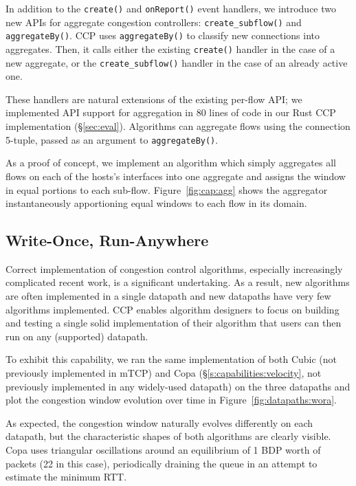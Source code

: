  In addition to the \texttt{create()} and \texttt{onReport()} event handlers, we introduce two new APIs for aggregate congestion controllers: \texttt{create\_subflow()} and \texttt{aggregateBy()}.
CCP uses \texttt{aggregateBy()} to classify new connections into aggregates. Then, it calls either the existing \texttt{create()} handler in the case of a new aggregate, or the \texttt{create\_subflow()} handler in the case of an already active one.

These handlers are natural extensions of the existing per-flow API; we implemented API support for aggregation in $80$ lines of code in our Rust CCP implementation (\S\ref{sec:eval}).
Algorithms can aggregate flows using the connection 5-tuple, passed as an argument to \texttt{aggregateBy()}.

As a proof of concept, we implement an algorithm which simply aggregates all flows on each of the hosts's interfaces into one aggregate and assigns the window in equal portions to each sub-flow.
Figure~\ref{fig:cap:agg} shows the aggregator instantaneously apportioning equal windows to each flow in its domain.

 
\subsection{Write-Once, Run-Anywhere}
\label{s:capabilities:wora}
\label{s:datapaths:eval}

Correct implementation of congestion control algorithms, especially increasingly complicated recent work, is a significant undertaking.
As a result, new algorithms are often implemented in a single datapath and new datapaths have very few algorithms implemented. 
CCP enables algorithm designers to focus on building and testing a single solid implementation of their algorithm that users can then run on any (supported) datapath. 

To exhibit this capability, we ran the same implementation of both Cubic (not previously implemented in mTCP) and Copa (\S\ref{s:capabilities:velocity}, not previously implemented in any widely-used datapath) on the three datapaths and plot the congestion window evolution over time in Figure~\ref{fig:datapaths:wora}.

As expected, the congestion window naturally evolves differently on each datapath, but the characteristic shapes of both algorithms are clearly visible. Copa uses triangular oscillations around an equilibrium of 1 BDP worth of packets (22 in this case), periodically draining the queue in an attempt to estimate the minimum RTT.
